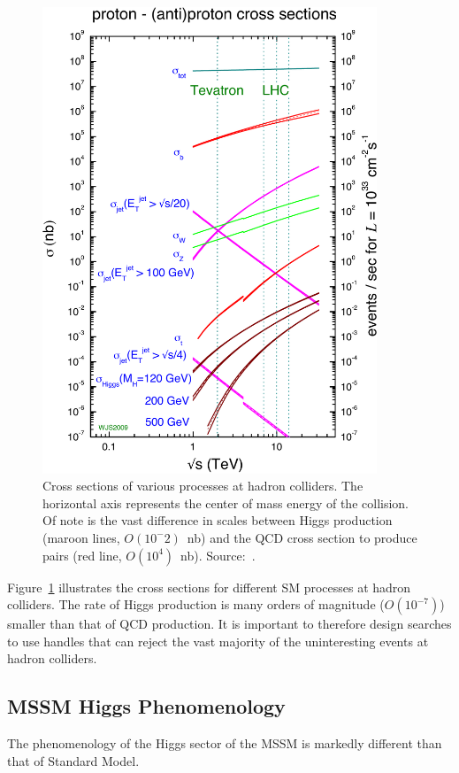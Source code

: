 \begin{figure}
  \centering
  \includegraphics[width=100mm,angle=00]{theory_chapter/figures/collider_crosssections.pdf}
  \caption[Cross sections of interest at hadron colliders]{Cross sections of
  various processes at hadron colliders.  The horizontal axis represents the
  center of mass energy of the collision.  Of note is the vast difference in
  scales between Higgs production (maroon lines, $O(10^-2)$~nb) and the QCD
  cross section to produce \bbbar pairs (red line, $O(10^4)$~nb).
  Source:~\cite{MSTWXSectionPlots}.} 
  \label{fig:HadronColliderCrossSections}
\end{figure}
Figure~\ref{fig:HadronColliderCrossSections} illustrates the cross sections for
different SM processes at hadron colliders.  The rate of Higgs production is
many orders of magnitude ($O(10^{-7})$) smaller than that of QCD production.  It
is important to therefore design searches to use handles that can reject the
vast majority of the uninteresting events at hadron colliders.  

\subsection{MSSM Higgs Phenomenology}
The phenomenology of the Higgs sector of the MSSM is markedly different than
that of Standard Model.  
